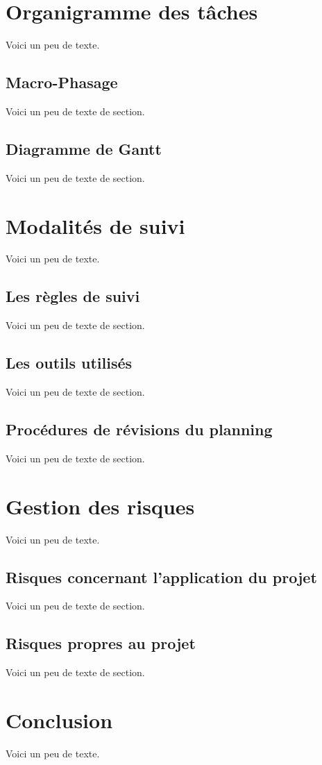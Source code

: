     \chapter{Organigramme des tâches}
    Voici un peu de texte.
    \section{Macro-Phasage}
    Voici un peu de texte de section.
    \section{Diagramme de Gantt}
    Voici un peu de texte de section.
    
    \chapter{Modalités de suivi}
    Voici un peu de texte.
    \section{Les règles de suivi}
    Voici un peu de texte de section.
    \section{Les outils utilisés}
    Voici un peu de texte de section.
    \section{Procédures de révisions du planning}
    Voici un peu de texte de section.
    
    \chapter{Gestion des risques}
    Voici un peu de texte.
    \section{Risques concernant l'application du projet}
    Voici un peu de texte de section.
    \section{Risques propres au projet}
    Voici un peu de texte de section.
    
    \chapter{Conclusion}
    Voici un peu de texte.
    
